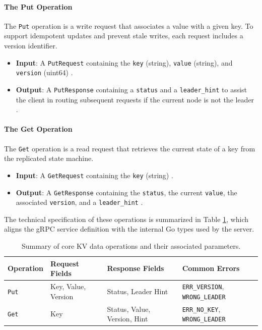 \paragraph{The Put Operation}
The \texttt{Put} operation is a write request that associates a value with a given key. To support idempotent updates and prevent stale writes, each request includes a version identifier.
\begin{itemize}
    \item \textbf{Input}: A \texttt{PutRequest} containing the \texttt{key} (string), \texttt{value} (string), and \texttt{version} (uint64) \cite{1}.
    \item \textbf{Output}: A \texttt{PutResponse} containing a \texttt{status} and a \texttt{leader\_hint} to assist the client in routing subsequent requests if the current node is not the leader \cite{1}.
\end{itemize}

\paragraph{The Get Operation}
The \texttt{Get} operation is a read request that retrieves the current state of a key from the replicated state machine.
\begin{itemize}
    \item \textbf{Input}: A \texttt{GetRequest} containing the \texttt{key} (string) \cite{1}.
    \item \textbf{Output}: A \texttt{GetResponse} containing the \texttt{status}, the current \texttt{value}, the associated \texttt{version}, and a \texttt{leader\_hint} \cite{1}.
\end{itemize}

The technical specification of these operations is summarized in Table \ref{tab:kv_api_summary}, which aligns the gRPC service definition with the internal Go types used by the server.

\begin{table}[h]
\centering
\caption{Summary of core KV data operations and their associated parameters.}
\label{tab:kv_api_summary}
\begin{tabular}{|l|l|l|l|}
\hline
\textbf{Operation} & \textbf{Request Fields} & \textbf{Response Fields} & \textbf{Common Errors} \\ \hline
\texttt{Put} & Key, Value, Version \cite{1} & Status, Leader Hint \cite{1} & \texttt{ERR\_VERSION}, \texttt{WRONG\_LEADER} \cite{1} \\ \hline
\texttt{Get} & Key \cite{1} & Status, Value, Version, Hint \cite{1} & \texttt{ERR\_NO\_KEY}, \texttt{WRONG\_LEADER} \cite{1} \\ \hline
\end{tabular}
\end{table}

